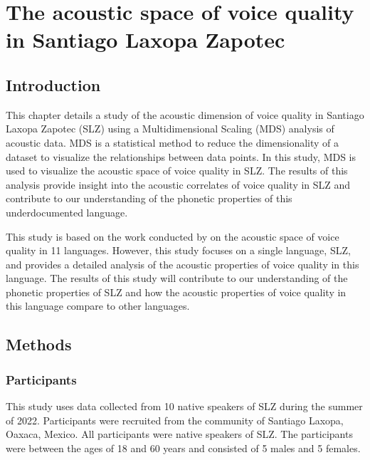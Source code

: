 \chapter{The acoustic space of voice quality in Santiago Laxopa Zapotec} \label{ch:acousticlandscape}

\section{Introduction} \label{sec:acousticlandscape:intro}

This chapter details a study of the acoustic dimension of voice quality in Santiago Laxopa Zapotec (SLZ) using a Multidimensional Scaling (MDS) analysis of acoustic data. MDS is a statistical method to reduce the dimensionality of a dataset to visualize the relationships between data points. In this study, MDS is used to visualize the acoustic space of voice quality in SLZ. The results of this analysis provide insight into the acoustic correlates of voice quality in SLZ and contribute to our understanding of the phonetic properties of this underdocumented language.

This study is based on the work conducted by \citet{keatingCrosslanguageAcousticSpace2023} on the acoustic space of voice quality in 11 languages. However, this study focuses on a single language, SLZ, and provides a detailed analysis of the acoustic properties of voice quality in this language. The results of this study will contribute to our understanding of the phonetic properties of SLZ and how the acoustic properties of voice quality in this language compare to other languages.

\section{Methods} \label{sec:acousticlandscape:methods}
\subsection{Participants} \label{sec:acousticlandscape:participants}

This study uses data collected from 10 native speakers of SLZ during the summer of 2022. Participants were recruited from the community of Santiago Laxopa, Oaxaca, Mexico. All participants were native speakers of SLZ. The participants were between the ages of 18 and 60 years and consisted of 5 males and 5 females.
